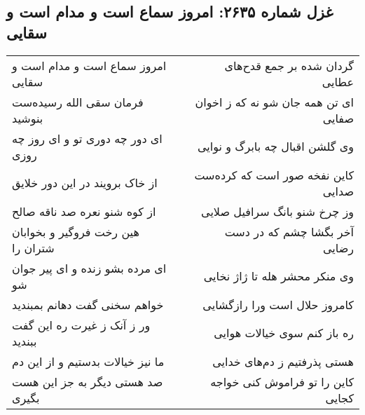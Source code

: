 \begin{center}
\section*{غزل شماره ۲۶۳۵: امروز سماع است و مدام است و سقایی}
\label{sec:2635}
\begin{longtable}{l p{0.5cm} r}
امروز سماع است و مدام است و سقایی
&&
گردان شده بر جمع قدح‌های عطایی
\\
فرمان سقی الله رسیده‌ست بنوشید
&&
ای تن همه جان شو نه که ز اخوان صفایی
\\
ای دور چه دوری تو و ای روز چه روزی
&&
وی گلشن اقبال چه بابرگ و نوایی
\\
از خاک برویند در این دور خلایق
&&
کاین نفخه صور است که کرده‌ست صدایی
\\
از کوه شنو نعره صد ناقه صالح
&&
وز چرخ شنو بانگ سرافیل صلایی
\\
هین رخت فروگیر و بخوابان شتران را
&&
آخر بگشا چشم که در دست رضایی
\\
ای مرده بشو زنده و ای پیر جوان شو
&&
وی منکر محشر هله تا ژاژ نخایی
\\
خواهم سخنی گفت دهانم بمبندید
&&
کامروز حلال است ورا رازگشایی
\\
ور ز آنک ز غیرت ره این گفت ببندید
&&
ره باز کنم سوی خیالات هوایی
\\
ما نیز خیالات بدستیم و از این دم
&&
هستی پذرفتیم ز دم‌های خدایی
\\
صد هستی دیگر به جز این هست بگیری
&&
کاین را تو فراموش کنی خواجه کجایی
\\
\end{longtable}
\end{center}
